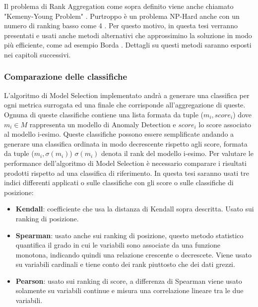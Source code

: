 Il problema di Rank Aggregation come sopra definito viene anche chiamato "Kemeny-Young Problem" \cite{pmlr-v54-korba17a}. Purtroppo è un problema NP-Hard anche con un numero di ranking basso come 4 \cite{inproceedingsrankagg}. Per questo motivo, in questa tesi verranno presentati e usati anche metodi alternativi che approssimino la soluzione in modo più efficiente, come ad esempio Borda \cite{borda}. Dettagli su questi metodi saranno esposti nei capitoli successivi.

\subsubsection{Comparazione delle classifiche}
L'algoritmo di Model Selection implementato andrà a generare una classifica per ogni metrica surrogata ed una finale che corrisponde all'aggregazione di queste. Ognuna di queste classifiche contiene una lista formata da tuple (\(m_i, score_i\)) dove $m_i \in M $ rappresenta un modello di Anomaly Detection e $score_i$ lo score associato al modello i-esimo.
Queste classifiche possono essere semplificate andando a generare una classifica ordinata in modo decrescente rispetto agli score, formata da tuple (\(m_i, \sigma(m_i)\)) $\sigma(m_i)$ denota il rank del modello i-esimo.
Per valutare le performance dell'algoritmo di Model Selection è necessario comparare i risultati prodotti rispetto ad una classifica di riferimento.
In questa tesi saranno usati tre indici differenti applicati o sulle classifiche con gli score o sulle classifiche di posizione:

\begin{itemize}
	\item \textbf{Kendall}: coefficiente che usa la distanza di Kendall sopra descritta. Usato sui ranking di posizione.
	\item \textbf{Spearman}: usato anche sui ranking di posizione, questo metodo statistico quantifica il grado in cui le variabili sono associate da una funzione monotona, indicando quindi una relazione crescente o decrescete. Viene usato su variabili cardinali e tiene conto dei rank piuttosto che dei dati grezzi.
	\item \textbf{Pearson}: usato sui ranking di score, a differenza di Spearman viene usato solamente su variabili continue e misura una correlazione lineare tra le due variabili.
\end{itemize}
